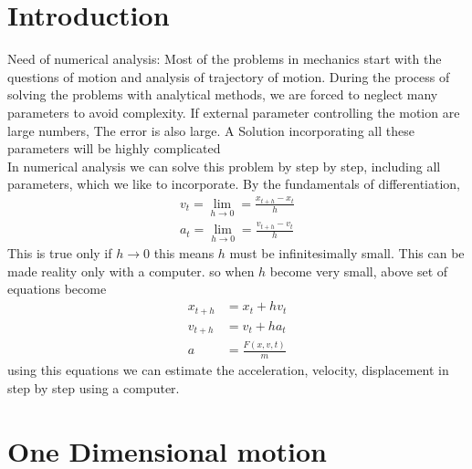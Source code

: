 \documentclass[12pt,a4paper]{article}
\begin{document}
	\section{Introduction}
	Need of numerical analysis: Most of the problems in mechanics start with the questions of motion and analysis of trajectory of motion. 
	During the process of solving the problems with analytical methods, we are forced to neglect many parameters to avoid complexity.
	If external parameter controlling the motion are large numbers, The error is also large.
	A Solution incorporating all these parameters will be highly complicated\\
	In numerical analysis we can solve this problem by step by step, including all parameters, which we like to incorporate. By the fundamentals of differentiation,  
	\begin{align}
		v_t=\lim_{h \to 0} = \frac{x_{t+h}-x_t}{h}\\
		a_t=\lim_{h \to 0} = \frac{v_{t+h}-v_t}{h}
	\end{align}
	This is true only if \(h \rightarrow 0\) this means \(h\) must be infinitesimally small. This can be made reality only with a computer.
	so when \(h\) become very small, above set of equations become
	\begin{align}
		x_{t+h}&=x_t+hv_t\\
		v_{t+h}&=v_t+ha_t\\
		a&=\frac{F(x,v,t)}{m}
	\end{align}
	using this equations we can estimate the acceleration, velocity, displacement in step by step using a computer.
	\section{One Dimensional motion }
\end{document}
